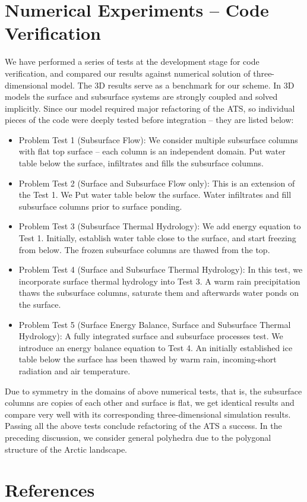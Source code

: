 \documentclass[review]{elsarticle}
\begin{document}
\appendix
\section{Numerical Experiments -- Code Verification}\label{code-verification}
We have performed a series of tests at the development stage for code verification, and compared our results against numerical solution of three-dimensional model. The 3D results serve as a benchmark for our scheme. In 3D models the surface and subsurface systems are strongly coupled and solved implicitly. Since our model required major refactoring of the ATS, so individual pieces of the code were deeply tested before integration -- they are listed below:
\begin{itemize}
\item{ Problem Test 1 (Subsurface Flow): 
We consider multiple subsurface columns with flat top surface -- each column is an independent domain. Put water table below the surface, infiltrates and fills the subsurface columns.
}
\item{ Problem Test 2 (Surface and Subsurface Flow only): 
This is an extension of the Test 1. We Put water table below the surface. Water infiltrates and fill subsurface columns prior to surface ponding. 
}

\item{ Problem Test 3 (Subsurface Thermal Hydrology): 
We add energy equation to Test 1. Initially, establish water table close to the surface, and start freezing from below. The frozen subsurface columns are thawed from the top.}

\item{ Problem Test 4 (Surface and Subsurface Thermal Hydrology):
In this test, we incorporate surface thermal hydrology into Test 3. A warm rain precipitation thaws the subsurface columns, saturate them and afterwards water ponds on the surface.}

\item{ Problem Test 5 (Surface Energy Balance, Surface and Subsurface Thermal Hydrology):
A fully integrated surface and subsurface processes test. We introduce an energy balance equation to Test 4. An initially established ice table below the surface has been thawed by warm rain, incoming-short radiation and air temperature.}

\end{itemize}
Due to symmetry in the domains of above numerical tests, that is, the subsurface columns are copies of each other and surface is flat, we get identical results and compare very well with its corresponding three-dimensional simulation results. Passing all the above tests conclude refactoring of the ATS a success. In the preceding discussion, we consider general polyhedra due to the polygonal structure of the Arctic landscape.


\section*{References}


\end{document}
